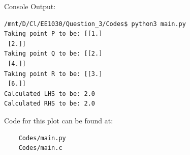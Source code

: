 \documentclass[journal]{IEEEtran}
\begin{document}
Console Output:
\begin{verbatim}
/mnt/D/Cl/EE1030/Question_3/Codes$ python3 main.py 
Taking point P to be: [[1.]
 [2.]]
Taking point Q to be: [[2.]
 [4.]]
Taking point R to be: [[3.]
 [6.]]
Calculated LHS to be: 2.0
Calculated RHS to be: 2.0
\end{verbatim}

Code for this plot can be found at:
\begin{lstlisting}
    Codes/main.py
    Codes/main.c
\end{lstlisting}
\end{document}
